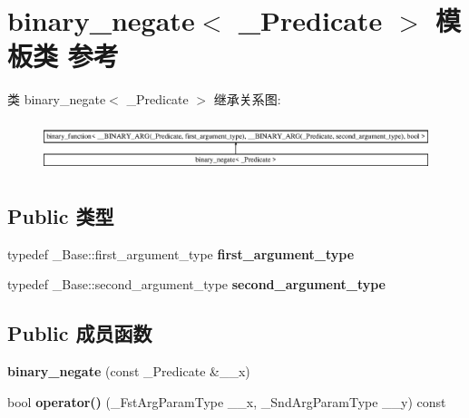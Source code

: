 \hypertarget{classbinary__negate}{}\section{binary\+\_\+negate$<$ \+\_\+\+Predicate $>$ 模板类 参考}
\label{classbinary__negate}
类 binary\+\_\+negate$<$ \+\_\+\+Predicate $>$ 继承关系图\+:\begin{figure}[H]
\begin{center}
\leavevmode
\includegraphics[height=1.477572cm]{classbinary__negate}
\end{center}
\end{figure}
\subsection*{Public 类型}
\begin{DoxyCompactItemize}
\item 
\mbox{\label{classbinary__negate_acac09bcb0191330b40ca181d4f48ebab}} 
typedef \+\_\+\+Base\+::first\+\_\+argument\+\_\+type {\bfseries first\+\_\+argument\+\_\+type}
\item 
\mbox{\label{classbinary__negate_a098fda1e034306ef3471b159a1008b0e}} 
typedef \+\_\+\+Base\+::second\+\_\+argument\+\_\+type {\bfseries second\+\_\+argument\+\_\+type}
\end{DoxyCompactItemize}
\subsection*{Public 成员函数}
\begin{DoxyCompactItemize}
\item 
\mbox{\label{classbinary__negate_ae7dcdc1a2b22c1db75979a08d0bb963c}} 
{\bfseries binary\+\_\+negate} (const \+\_\+\+Predicate \&\+\_\+\+\_\+x)
\item 
\mbox{\label{classbinary__negate_a9851f8136b08f03867a0d409f352a80b}} 
bool {\bfseries operator()} (\+\_\+\+Fst\+Arg\+Param\+Type \+\_\+\+\_\+x, \+\_\+\+Snd\+Arg\+Param\+Type \+\_\+\+\_\+y) const
\end{DoxyCompactItemize}
